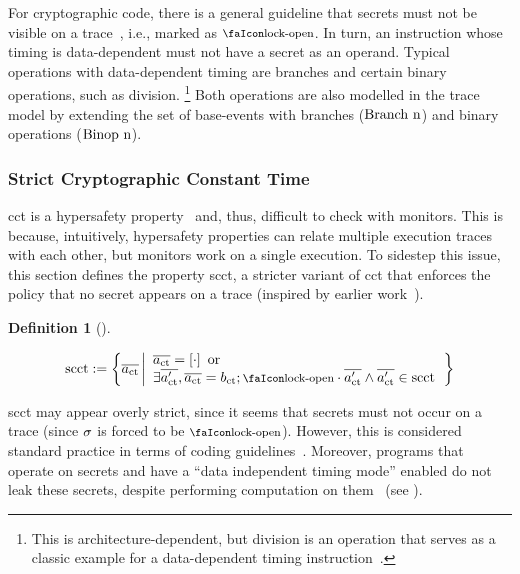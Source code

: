 \documentclass[dvipsnames,conference]{IEEEtran}
\theoremstyle{definition}
\newtheorem{definition}{Definition}[section]
\begin{document}
For cryptographic code, there is a general guideline that secrets must not be visible on a trace~\cite{ctguidelines}, i.e., marked as $\unlock$.
In turn, an instruction whose timing is data-dependent must not have a secret as an operand.
Typical operations with data-dependent timing are branches and certain binary operations, such as division. 
\footnote{
	This is architecture-dependent, but division is an operation that serves as a classic example for a data-dependent timing instruction~\cite[p.~755]{arm-refman}.
}
Both operations are also modelled in the trace model by extending the set of base-events with branches ($\text{Branch\ n}$) and binary operations ($\text{Binop\ n}$).

\subsubsection{Strict Cryptographic Constant Time}

\gls*{cct} is a hypersafety property~\cite{barthe2018sec} and, thus, difficult to check with monitors.
This is because, intuitively, hypersafety properties can relate multiple execution traces with each other, but monitors work on a single execution.
To sidestep this issue, this section defines the property \gls*{scct}, a stricter variant of \gls*{cct} that enforces the policy that no secret appears on a trace (inspired by earlier work~\cite{almeida2017jasmin}).

\begin{definition}[]\label{def:trace:scctdef}
  
  \noindent\[
  \scctsafe:=\left\{\trace[_{\ctsafe}] \left|\begin{array}{l}
      \trace[_{\ctsafe}]=\hole{\cdot} \text{ or } \\\exists\trace[_{\ctsafe}'],\trace[_{\ctsafe}]=\preevent[_{\ctsafe}];\unlock\cdot\trace[_{\ctsafe}'] \wedge \trace[_{\ctsafe}']\in\scctsafe
    \end{array}\right.\right\}
  \]
\end{definition}

\gls*{scct} may appear overly strict, since it seems that secrets must not occur on a trace (since $\sigma$ is forced to be $\unlock$). 
However, this is considered standard practice in terms of coding guidelines~\cite{ctguidelines}.
Moreover, programs that operate on secrets and have a ``data independent timing mode'' enabled do not leak these secrets, despite performing computation on them~\cite{arm-refman,intel-refman} (see ). 
\end{document}

